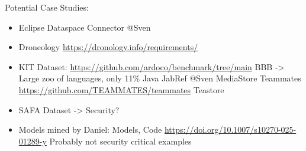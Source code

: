 Potential Case Studies:
\begin{itemize}
	\item Eclipse Dataspace Connector @Sven
	\item Droneology \url{https://dronology.info/requirements/}
	\item KIT Dataset: \url{https://github.com/ardoco/benchmark/tree/main}
	\subitem BBB -> Large zoo of languages, only 11\% Java
	\subitem JabRef @Sven
	\subitem MediaStore
	\subitem Teammates \url{https://github.com/TEAMMATES/teammates}
	\subitem Teastore
	\item SAFA Dataset -> Security?
	\item Models mined by Daniel: Models, Code \url{https://doi.org/10.1007/s10270-025-01289-y} Probably not security critical examples
\end{itemize}